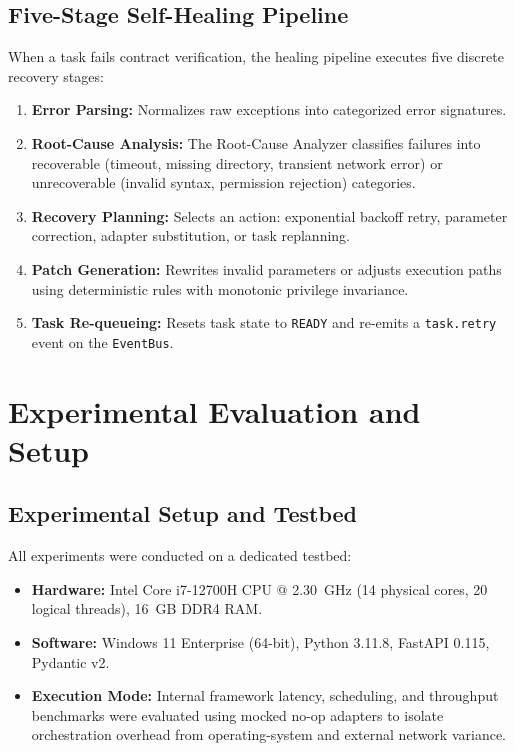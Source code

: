 \documentclass[conference]{IEEEtran}
\begin{document}
\subsection{Five-Stage Self-Healing Pipeline}
When a task fails contract verification, the healing pipeline executes five discrete recovery stages:
\begin{enumerate}
    \item \textbf{Error Parsing:} Normalizes raw exceptions into categorized error signatures.
    \item \textbf{Root-Cause Analysis:} The Root-Cause Analyzer classifies failures into recoverable (timeout, missing directory, transient network error) or unrecoverable (invalid syntax, permission rejection) categories.
    \item \textbf{Recovery Planning:} Selects an action: exponential backoff retry, parameter correction, adapter substitution, or task replanning.
    \item \textbf{Patch Generation:} Rewrites invalid parameters or adjusts execution paths using deterministic rules with monotonic privilege invariance.
    \item \textbf{Task Re-queueing:} Resets task state to \texttt{READY} and re-emits a \texttt{task.retry} event on the \texttt{EventBus}.
\end{enumerate}

\section{Experimental Evaluation and Setup}

\subsection{Experimental Setup and Testbed}
All experiments were conducted on a dedicated testbed:
\begin{itemize}
    \item \textbf{Hardware:} Intel Core i7-12700H CPU @ 2.30~GHz (14 physical cores, 20 logical threads), 16~GB DDR4 RAM.
    \item \textbf{Software:} Windows 11 Enterprise (64-bit), Python 3.11.8, FastAPI 0.115, Pydantic v2.
    \item \textbf{Execution Mode:} Internal framework latency, scheduling, and throughput benchmarks were evaluated using mocked no-op adapters to isolate orchestration overhead from operating-system and external network variance.
\end{itemize}
\end{document}
